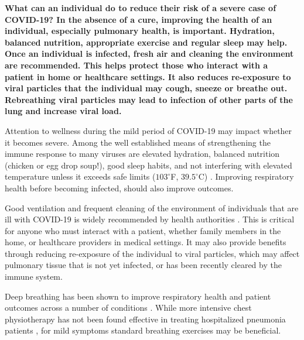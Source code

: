 \documentclass[onecolumn,journal]{IEEEtran}
\begin{document}
\begin{multicols}{2}




\textbf{What can an individual do to reduce their risk of a severe case of COVID-19? In the absence of a cure, improving the health of an individual, especially pulmonary health, is important. Hydration, balanced nutrition, appropriate exercise and regular sleep may help. Once an individual is infected, fresh air and cleaning the environment are recommended. This helps protect those who interact with a patient in home or healthcare settings. It also reduces re-exposure to viral particles that the individual may cough, sneeze or breathe out. Rebreathing viral particles may lead to infection of other parts of the lung and increase viral load. }

Attention to wellness during the mild period of COVID-19 may impact whether it becomes severe. Among the well established means of strengthening the immune response to many viruses are elevated hydration, balanced nutrition (chicken or egg drop soup!), good sleep habits, and not interfering with elevated temperature unless it exceeds safe limits ($103^\circ$F, $39.5^\circ$C) \cite{evans2015fever}. Improving respiratory health before becoming infected, should also improve outcomes. 

Good ventilation and frequent cleaning of the environment of individuals that are ill with COVID-19 is widely recommended by health authorities \cite{CDC, NZ, CA, stcn}. This is critical for anyone who must interact with a patient, whether family members in the home, or healthcare providers in medical settings. It may also provide benefits through reducing re-exposure of the individual to viral particles, which may affect pulmonary tissue that is not yet infected, or has been recently cleared by the immune system.

Deep breathing has been shown to improve respiratory health and patient outcomes across a number of conditions \cite{vitacca1998acute, westerdahl2016deep, westerdahl2015optimal}. While more intensive chest physiotherapy has not been found effective in treating hospitalized pneumonia patients \cite{britton1985chest}, for mild symptoms standard breathing exercises may be beneficial.


\end{multicols}
\end{document}
